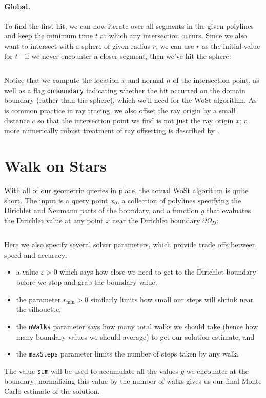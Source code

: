 \documentclass{article}
\newcommand{\code}[1]{\texttt{\small{#1}}}
\renewcommand{\vec}[1]{#1}
\begin{document}
\paragraph{Global.} To find the first hit, we can now iterate over all segments in the given polylines and keep the minimum time \(t\) at which any intersection occurs.  Since we also want to intersect with a sphere of given radius \(r\), we can use \(r\) as the initial value for \(t\)---if we never encounter a closer segment, then we've hit the sphere:

\inputminted[fontsize=\small,linenos,firstline=90,lastline=113,bgcolor=bg]{cpp}{../code/WoStLaplace2D.cpp}

Notice that we compute the location \(x\) and normal \(n\) of the intersection point, as well as a flag \code{onBoundary} indicating whether the hit occurred on the domain boundary (rather than the sphere), which we'll need for the WoSt algorithm.  As is common practice in ray tracing, we also offset the ray origin by a small distance \(c\) so that the intersection point we find is not just the ray origin \(x\); a more numerically robust treatment of ray offsetting is described by \citet{wachter2019fast}.

\section{Walk on Stars}
\label{sec:WalkOnStars}

With all of our geometric queries in place, the actual WoSt algorithm is quite short.  The input is a query point \(\vec{x}_0\), a collection of polylines specifying the Dirichlet and Neumann parts of the boundary, and a function \(g\) that evaluates the Dirichlet value at any point \(x\) near the Dirichlet boundary \(\partial\Omega_D\):

\inputminted[fontsize=\small,linenos,firstline=119,lastline=126,bgcolor=bg]{cpp}{../code/WoStLaplace2D.cpp}

Here we also specify several solver parameters, which provide trade offs between speed and accuracy:
\begin{itemize}
   \item a value \(\varepsilon > 0\) which says how close we need to get to the Dirichlet boundary before we stop and grab the boundary value,
   \item the parameter \(r_{\min} > 0\) similarly limits how small our steps will shrink near the silhouette,
   \item the \code{nWalks} parameter says how many total walks we should take (hence how many boundary values we should average) to get our solution estimate, and
   \item the \code{maxSteps} parameter limits the number of steps taken by any walk.
\end{itemize}
The value \code{sum} will be used to accumulate all the values \(g\) we encounter at the boundary; normalizing this value by the number of walks gives us our final Monte Carlo estimate of the solution.  
\end{document}

